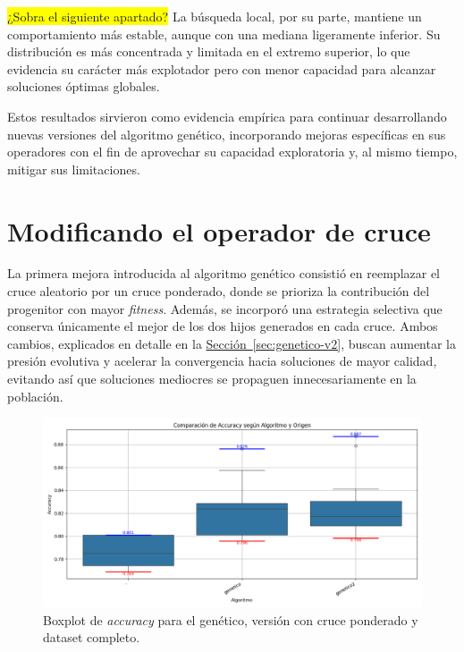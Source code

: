 \colorbox{yellow}{¿Sobra el siguiente apartado?}
La búsqueda local, por su parte, mantiene un comportamiento más estable, aunque con una mediana ligeramente inferior.
Su distribución es más concentrada y limitada en el extremo superior, lo que evidencia su carácter más explotador pero con menor capacidad para alcanzar soluciones óptimas globales.

Estos resultados sirvieron como evidencia empírica para continuar desarrollando nuevas versiones del algoritmo genético,
incorporando mejoras específicas en sus operadores con el fin de aprovechar su capacidad exploratoria y, al mismo tiempo, mitigar sus limitaciones.

\section{Modificando el operador de cruce}\label{sec:incorporacion-cruce}
La primera mejora introducida al algoritmo genético consistió en reemplazar el cruce aleatorio por un cruce ponderado,
donde se prioriza la contribución del progenitor con mayor \textit{fitness}.
Además, se incorporó una estrategia selectiva que conserva únicamente el mejor de los dos hijos generados en cada cruce.
Ambos cambios, explicados en detalle en la \hyperref[sec:genetico-v2]{Sección~\ref*{sec:genetico-v2}},
buscan aumentar la presión evolutiva y acelerar la convergencia hacia soluciones de mayor calidad,
evitando así que soluciones mediocres se propaguen innecesariamente en la población.

\begin{figure}[htp]
    \centering
    \includegraphics[width=1\textwidth]{imagenes/evaluaciones/operador-de-cruce}
    \caption{Boxplot de \textit{accuracy} para el genético, versión con cruce ponderado y dataset completo.}
    \label{fig:cruce_ponderado}
\end{figure}

